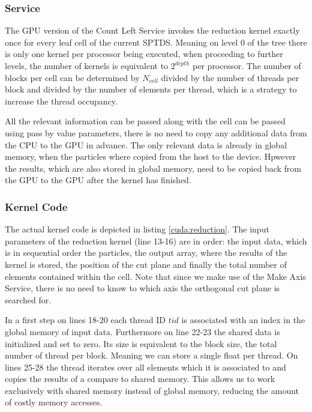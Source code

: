 \documentclass[]{article}
\begin{document}
\subsubsection{Service}

The GPU version of the Count Left Service invokes the reduction kernel exactly once for every leaf cell of the current SPTDS. Meaning on level 0 of the tree there is only one kernel per processor being executed, when proceeding to further levels, the number of kernels is equivalent to $2^{depth}$ per processor. 
The number of blocks per cell can be determined by $N_{cell}$ divided by the number of threads per block and divided by the number of elements per thread, which is a strategy to increase the thread occupancy. 

All the relevant information can be passed along with the cell can be passed using pass by value  parameters, there is no need to copy any additional data from the CPU to the GPU in advance. The only relevant data is already in global memory, when the particles where copied from the host to the device. Hpwever the results, which are also stored in global memory, need to be copied back from the GPU to the GPU after the kernel has finished.

\subsubsection{Kernel Code}\label{sec:countleftcode}
The actual kernel code is depicted in listing \ref{cuda:reduction}. The input parameters of the reduction kernel (line 13-16) are in order: the input data, which is in sequential order the particles, the output array, where the results of the kernel is stored, the position of the cut plane and finally the total number of elements contained within the cell. Note that since we make use of the Make Axis Service, there is no need to know to which axis the orthogonal cut plane is searched for. 

In a first step on lines 18-20 each thread ID $tid$ is associated with an index in the global memory of input data. Furthermore on line 22-23 the shared data is initialized and set to zero. Its size is equivalent to the block size, the total number of thread per block. Meaning we can store a single float per thread. On lines 25-28 the thread iterates over all elements which it is associated to and copies the results of a compare to shared memory. This allows us to work exclusively with shared memory instead of global memory, reducing the amount of costly memory accesses.
\end{document}

